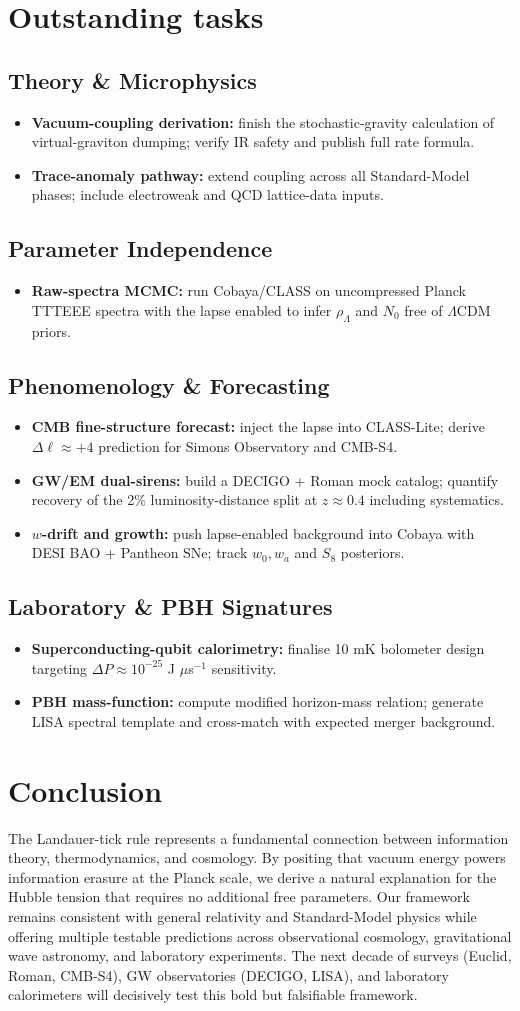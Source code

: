 \documentclass[12pt,a4paper]{article}
\newcommand{\sect}[1]{\section{#1}}
\newcommand{\subsect}[1]{\subsection{#1}}
\begin{document}
\sect{Outstanding tasks}

\subsect{Theory \& Microphysics}

\begin{itemize}
  \item \textbf{Vacuum-coupling derivation:} finish the stochastic-gravity calculation of virtual-graviton dumping; verify IR safety and publish full rate formula.
  \item \textbf{Trace-anomaly pathway:} extend coupling across all Standard-Model phases; include electroweak and QCD lattice-data inputs.
\end{itemize}

\subsect{Parameter Independence}

\begin{itemize}
  \item \textbf{Raw-spectra MCMC:} run Cobaya/CLASS on uncompressed Planck TTTEEE spectra with the lapse enabled to infer $\rho_\Lambda$ and $N_0$ free of $\Lambda$CDM priors.
\end{itemize}

\subsect{Phenomenology \& Forecasting}

\begin{itemize}
  \item \textbf{CMB fine-structure forecast:} inject the lapse into CLASS-Lite; derive $\Delta\ell \approx +4$ prediction for Simons Observatory and CMB-S4.
  \item \textbf{GW/EM dual-sirens:} build a DECIGO + Roman mock catalog; quantify recovery of the 2\% luminosity-distance split at $z \approx 0.4$ including systematics.
  \item \textbf{$w$-drift and growth:} push lapse-enabled background into Cobaya with DESI BAO + Pantheon SNe; track $w_0, w_a$ and $S_8$ posteriors.
\end{itemize}

\subsect{Laboratory \& PBH Signatures}

\begin{itemize}
  \item \textbf{Superconducting-qubit calorimetry:} finalise 10 mK bolometer design targeting $\Delta P \approx 10^{-25}$ J $\mu$s$^{-1}$ sensitivity.
  \item \textbf{PBH mass-function:} compute modified horizon-mass relation; generate LISA spectral template and cross-match with expected merger background.
\end{itemize}

\sect{Conclusion}

The Landauer-tick rule represents a fundamental connection between information theory, thermodynamics, and cosmology. By positing that vacuum energy powers information erasure at the Planck scale, we derive a natural explanation for the Hubble tension that requires no additional free parameters. Our framework remains consistent with general relativity and Standard-Model physics while offering multiple testable predictions across observational cosmology, gravitational wave astronomy, and laboratory experiments. The next decade of surveys (Euclid, Roman, CMB-S4), GW observatories (DECIGO, LISA), and laboratory calorimeters will decisively test this bold but falsifiable framework.
\end{document}
